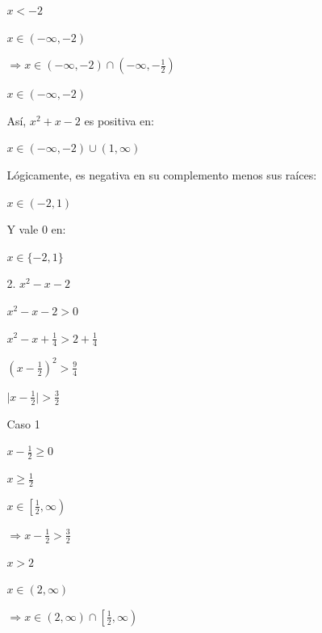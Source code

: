 \documentclass{article}
\begin{document}
\begin{enumerate}
\begin{enumerate}
\begin{enumerate}
\begin{multicols}{2}
              $x < -2$

              $x \in (-\infty, -2)$
              \vspace{\baselineskip}
              
              $\Rightarrow x \in (-\infty, -2) \cap (-\infty, -\frac{1}{2})$

              $x \in (-\infty, -2)$
              \end{multicols}
              Así, \(x^2+x-2\) es positiva en:

              $x \in (-\infty, -2) \cup (1, \infty)$
              \vspace{\baselineskip}
              
              Lógicamente, es negativa en su complemento menos sus raíces:

              $x \in (-2, 1)$
              \vspace{\baselineskip}

              Y vale $0$ en:

              $x \in \{-2, 1\}$

              \item[2.]$x^2 - x - 2$
              \vspace{\baselineskip}
              
              $x^2 - x - 2 > 0$

              $x^2 - x + \frac{1}{4} > 2 + \frac{1}{4}$

              $(x - \frac{1}{2})^2 > \frac{9}{4}$

              $\lvert x - \frac{1}{2}\rvert > \frac{3}{2}$

              \begin{multicols}{2}
              Caso 1
              
              $x - \frac{1}{2} \geq 0$

              $x \geq \frac{1}{2}$

              $x \in \left[ \frac{1}{2}, \infty \right)$
              \vspace{\baselineskip}

              $\Rightarrow x - \frac{1}{2} > \frac{3}{2}$

              $x > 2$

              $x \in (2, \infty)$
              \vspace{\baselineskip}

              $\Rightarrow x \in (2, \infty) \cap \left[ \frac{1}{2}, \infty \right)$


\end{multicols}
\end{enumerate}
\end{enumerate}
\end{enumerate}
\end{document}
